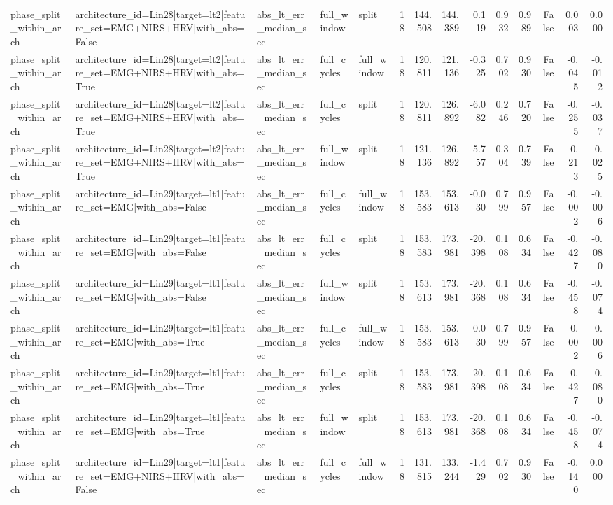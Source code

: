 \begin{table}
\begin{tabular}{lllllrrrrrrrrr}
phase_split_within_arch & architecture_id=Lin28|target=lt2|feature_set=EMG+NIRS+HRV|with_abs=False & abs_lt_err_median_sec & full_window & split & 18 & 144.508 & 144.389 & 0.119 & 0.932 & 0.989 & False & 0.003 & 0.000 \\
phase_split_within_arch & architecture_id=Lin28|target=lt2|feature_set=EMG+NIRS+HRV|with_abs=True & abs_lt_err_median_sec & full_cycles & full_window & 18 & 120.811 & 121.136 & -0.325 & 0.702 & 0.930 & False & -0.045 & -0.012 \\
phase_split_within_arch & architecture_id=Lin28|target=lt2|feature_set=EMG+NIRS+HRV|with_abs=True & abs_lt_err_median_sec & full_cycles & split & 18 & 120.811 & 126.892 & -6.082 & 0.246 & 0.720 & False & -0.255 & -0.037 \\
phase_split_within_arch & architecture_id=Lin28|target=lt2|feature_set=EMG+NIRS+HRV|with_abs=True & abs_lt_err_median_sec & full_window & split & 18 & 121.136 & 126.892 & -5.757 & 0.304 & 0.739 & False & -0.213 & -0.025 \\
phase_split_within_arch & architecture_id=Lin29|target=lt1|feature_set=EMG|with_abs=False & abs_lt_err_median_sec & full_cycles & full_window & 18 & 153.583 & 153.613 & -0.030 & 0.799 & 0.957 & False & -0.002 & -0.006 \\
phase_split_within_arch & architecture_id=Lin29|target=lt1|feature_set=EMG|with_abs=False & abs_lt_err_median_sec & full_cycles & split & 18 & 153.583 & 173.981 & -20.398 & 0.108 & 0.634 & False & -0.427 & -0.080 \\
phase_split_within_arch & architecture_id=Lin29|target=lt1|feature_set=EMG|with_abs=False & abs_lt_err_median_sec & full_window & split & 18 & 153.613 & 173.981 & -20.368 & 0.108 & 0.634 & False & -0.458 & -0.074 \\
phase_split_within_arch & architecture_id=Lin29|target=lt1|feature_set=EMG|with_abs=True & abs_lt_err_median_sec & full_cycles & full_window & 18 & 153.583 & 153.613 & -0.030 & 0.799 & 0.957 & False & -0.002 & -0.006 \\
phase_split_within_arch & architecture_id=Lin29|target=lt1|feature_set=EMG|with_abs=True & abs_lt_err_median_sec & full_cycles & split & 18 & 153.583 & 173.981 & -20.398 & 0.108 & 0.634 & False & -0.427 & -0.080 \\
phase_split_within_arch & architecture_id=Lin29|target=lt1|feature_set=EMG|with_abs=True & abs_lt_err_median_sec & full_window & split & 18 & 153.613 & 173.981 & -20.368 & 0.108 & 0.634 & False & -0.458 & -0.074 \\
phase_split_within_arch & architecture_id=Lin29|target=lt1|feature_set=EMG+NIRS+HRV|with_abs=False & abs_lt_err_median_sec & full_cycles & full_window & 18 & 131.815 & 133.244 & -1.429 & 0.702 & 0.930 & False & -0.140 & 0.000 \\

\end{tabular}
\end{table}

